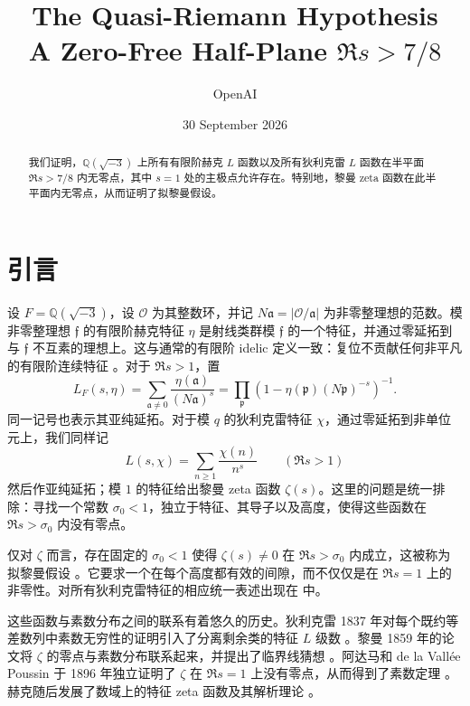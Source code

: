 \documentclass[11pt,a4paper]{article}
\title{The Quasi-Riemann Hypothesis\\[0.5em]
\large A Zero-Free Half-Plane \texorpdfstring{$\Re s>7/8$}{Re(s)>7/8}}
\author{OpenAI}
\date{30 September 2026}
\numberwithin{equation}{section}
\numberwithin{figure}{section}
\theoremstyle{definition}
\theoremstyle{remark}
\begin{document}
\maketitle

\begin{abstract}
我们证明，$\mathbb Q(\sqrt{-3})$ 上所有有限阶赫克 $L$ 函数以及所有狄利克雷 $L$ 函数在半平面 $\Re s>7/8$ 内无零点，其中 $s=1$ 处的主极点允许存在。特别地，黎曼 zeta 函数在此半平面内无零点，从而证明了拟黎曼假设。
\end{abstract}

\tableofcontents
\clearpage

\section{引言}\label{sec:introduction}

设 $F=\mathbb Q(\sqrt{-3})$，设 $\mathcal O$ 为其整数环，并记 $N\mathfrak a=|\mathcal O/\mathfrak a|$ 为非零整理想的范数。模非零整理想 $\mathfrak f$ 的有限阶赫克特征 $\eta$ 是射线类群模 $\mathfrak f$ 的一个特征，并通过零延拓到与 $\mathfrak f$ 不互素的理想上。这与通常的有限阶 idelic 定义一致：复位不贡献任何非平凡的有限阶连续特征 \cite[Chapter VI, Section 1]{MilneCFT}。对于 $\Re s>1$，置
\[
 L_F(s,\eta)=\sum_{\mathfrak a\ne0}
       \frac{\eta(\mathfrak a)}{(N\mathfrak a)^s}
 =\prod_{\mathfrak p}
       \left(1-\eta(\mathfrak p)(N\mathfrak p)^{-s}\right)^{-1}.
\]
同一记号也表示其亚纯延拓。对于模 $q$ 的狄利克雷特征 $\chi$，通过零延拓到非单位元上，我们同样记
\[
 L(s,\chi)=\sum_{n\ge1}\frac{\chi(n)}{n^s}
 \qquad(\Re s>1)
\]
然后作亚纯延拓；模 $1$ 的特征给出黎曼 zeta 函数 $\zeta(s)$。这里的问题是统一排除：寻找一个常数 $\sigma_0<1$，独立于特征、其导子以及高度，使得这些函数在 $\Re s>\sigma_0$ 内没有零点。

仅对 $\zeta$ 而言，存在固定的 $\sigma_0<1$ 使得 $\zeta(s)\ne0$ 在 $\Re s>\sigma_0$ 内成立，这被称为拟黎曼假设 \cite[Section 1]{BCSS}。它要求一个在每个高度都有效的间隙，而不仅仅是在 $\Re s=1$ 上的非零性。对所有狄利克雷特征的相应统一表述出现在 \cite[p.~288, Equation (1.4) and the following paragraph]{FG} 中。

这些函数与素数分布之间的联系有着悠久的历史。狄利克雷 1837 年对每个既约等差数列中素数无穷性的证明引入了分离剩余类的特征 $L$ 级数 \cite{Dirichlet}。黎曼 1859 年的论文将 $\zeta$ 的零点与素数分布联系起来，并提出了临界线猜想 \cite{Riemann}。阿达马和 de la Vall\'ee Poussin 于 1896 年独立证明了 $\zeta$ 在 $\Re s=1$ 上没有零点，从而得到了素数定理 \cite{Hadamard,ValleePoussin}。赫克随后发展了数域上的特征 zeta 函数及其解析理论 \cite{Hecke}。
\end{document}
